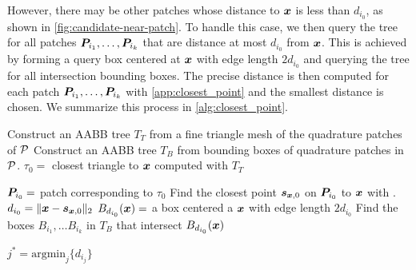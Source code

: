 However, there may be other patches whose distance to ${\bm{x}}$ is less than $d_{i_0}$, as shown in \cref{fig:candidate-near-patch}.
To handle this case, we then query the \aabb tree for all patches ${\bm{P}}_{i_1}, \hdots, {\bm{P}}_{i_k}$ that are distance at most $d_{i_0}$ from ${\bm{x}}$.
This is achieved by forming a query box centered at ${\bm{x}}$ with edge length $2d_{i_0}$ and querying the \aabb tree for all intersection bounding boxes. 
The precise distance is then computed for each patch  ${\bm{P}}_{i_1}, \hdots, {\bm{P}}_{i_k}$ with \cref{app:closest_point} and the smallest distance is chosen.
We summarize this process in \cref{alg:closest_point}.


\begin{algorithm}[!htp]

  \DontPrintSemicolon
  Construct an AABB tree $T_T$ from a fine triangle mesh of the quadrature patches of ${\mathcal{P}}$\;
  Construct an AABB tree $T_B$ from bounding boxes of quadrature patches in ${\mathcal{P}}$.\;
    $\tau_0 = $ closest triangle to ${\bm{x}}$ computed with $T_T$ \;
  
    ${\bm{P}}_{i_0} = $ patch corresponding to $\tau_0$\;
    Find the closest point $\bm{s}_{\bm{{\bm{x}}},0}$ on ${\bm{P}}_{i_0}$ to ${\bm{x}}$ with \cite[Section 2]{morse2020bsupplementary}.\;
    $d_{i_0} = \|{\bm{x}} - \bm{s}_{\bm{{\bm{x}}},0}\|_2$\;
    $B_{d_{i_0}}({\bm{x}})=$ a box centered a ${\bm{x}}$ with edge length $2d_{i_0}$\;
    Find the boxes $B_{i_1}, \hdots B_{i_k}$ in $T_B$ that intersect $B_{d_{i_0}}({\bm{x}})$\;
    
    $j^* = \mathrm{argmin}_j\{d_{i_j}\}$ \;
\end{algorithm}


